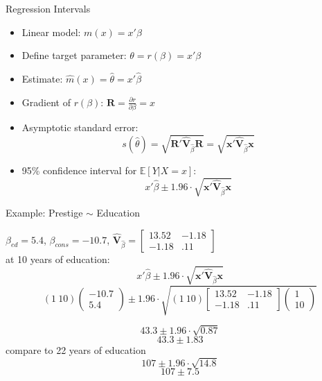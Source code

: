 \documentclass[aspectratio=169, handout, t]{beamer}
\numberwithin{equation}{section}
\begin{document}
\begin{frame}{Regression Intervals}
\begin{itemize}
\item Linear model: \quad \( m(x) = x' \beta \)
\item Define target parameter: \quad \( \theta = r(\beta) = x' \beta \)
\item Estimate: \quad \( \hat{m}(x) = \hat{\theta} = x' \hat{\beta} \)
\item Gradient of \( r(\beta) \): \quad \( \bm{R} = \frac{\partial r}{\partial \beta} = x \)
\item Asymptotic standard error:
\[
s(\hat{\theta}) = \sqrt{\bm{R}' \bm{\hat{V}}_{\hat{\beta}} \bm{R}}
= \sqrt{\bm{x}' \bm{\hat{V}}_{\hat{\beta}} \bm{x}}
\]
\item 95\% confidence interval for \( \mathbb{E}[Y | X = x] \):
\[
x' \hat{\beta} \pm 1.96 \cdot \sqrt{\bm{x}' \bm{\hat{V}}_{\hat{\beta}} \bm{x}}
\]
\end{itemize}
\end{frame}


\begin{frame}{Example: Prestige $\sim$ Education}

$\beta_{ed}=5.4$, $\beta_{cons}=-10.7$,  $\bm{\hat{V}}_{\hat{\beta}}=\begin{bmatrix} 13.52&-1.18\\-1.18&.11\end{bmatrix}$\\
at 10 years of education:
$$x' \hat{\beta} \pm 1.96 \cdot \sqrt{\bm{x}' \bm{\hat{V}}_{\hat{\beta}} \bm{x}}$$
$$(1\ 10) \begin{pmatrix}-10.7\\ 5.4\end{pmatrix} \pm 1.96 \cdot \sqrt{(1\ 10) \begin{bmatrix} 13.52&-1.18\\-1.18&.11\end{bmatrix}\begin{pmatrix}1\\ 10\end{pmatrix}}$$

$$43.3 \pm 1.96 \cdot \sqrt{0.87}$$
$$43.3 \pm 1.83$$
compare to 22 years of education
$$107 \pm 1.96 \cdot \sqrt{14.8}$$
$$107 \pm 7.5$$
\end{frame}

\end{document}
